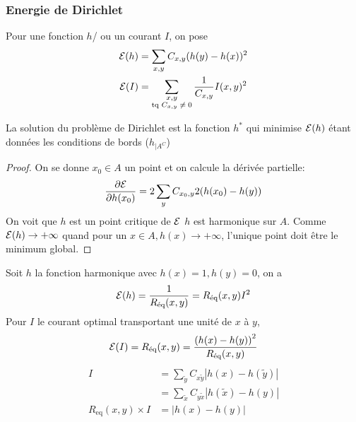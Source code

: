 \documentclass[]{report}
\begin{document}
    \subsubsection*{Energie de Dirichlet}

    Pour une fonction $h$/ ou un courant $I$, on pose
    \begin{align*}
        \mathcal{E}(h)&=\sum_{x,y}C_{x,y}(h(y)-h(x))^2\\
        \mathcal{E}(I)&=\sum_{\substack{x,y\\\text{tq $C_{x,y}\neq 0$}}}\frac{1}{C_{x,y}}I(x,y)^2
    \end{align*}

    \begin{prop}{}{}
        La solution du problème de Dirichlet est la fonction $h^*$ qui minimise $\mathcal{E}(h)$ étant données les conditions de bords ($h_{|A^C}$)
    \end{prop}

    \begin{proof}
        On se donne $x_0\in A$ un point et on calcule la dérivée partielle:
        \[\frac{\partial \mathcal{E}}{\partial h(x_0)}=2\sum_y C_{x_0,y} 2(h(x_0)-h(y))\]
        On voit que $h$ est un point critique de $\mathcal{E}$ \ssi $h$ est harmonique sur $A$. Comme $\mathcal{E}(h)\to +\infty$ quand pour un $x\in A, h(x)\to +\infty$, l'unique point doit être le minimum global.
    \end{proof}

    \begin{prop}{}{}
        Soit $h$ la fonction harmonique avec $h(x)=1,h(y)=0$, on a
        \[\mathcal{E}(h)=\frac{1}{R_{\text{éq}}(x,y)}=R_{\text{éq}}(x,y)I^2\]
        Pour $I$ le courant optimal transportant une unité de $x$ à $y$,
        \[\mathcal{E}(I)=R_{\text{éq}}(x,y)=\frac{\left(h(x)-h(y)\right)^2}{R_{\text{éq}}(x,y)}\]
        \begin{align*}
            I&=\sum_{\tilde{y}} C_{x\tilde{y}} \left|h(x)-h(\tilde{y})\right|\\
            &=\sum_{\tilde{x}}C_{y\tilde{x}}\left|h(\tilde{x})-h(y)\right|\\
            R_{\text{eq}}(x,y)\times I&=\left|h(x)-h(y)\right|
        \end{align*}
    \end{prop}
\end{document}
